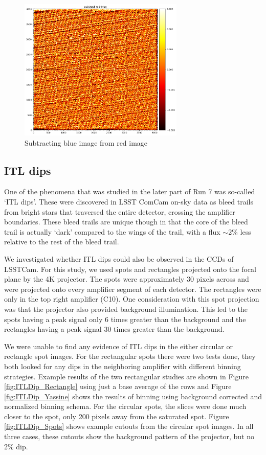 \begin{figure}[ht]
\centering
\includegraphics[width=0.7\textwidth]{figures/subtract_red_blue.png}
\caption{Subtracting blue image from red image}
\label{fig:tree_ring_subtract_red_blue}
\end{figure}

\clearpage
\subsection{ITL dips}\label{itl-dips}

One of the phenomena that was studied in the later part of Run 7 was so-called 
`ITL dips'. These were discovered in LSST ComCam on-sky data as
bleed trails from bright stars that traversed the entire detector,
crossing the amplifier boundaries. These bleed trails are unique
though in that the core of the bleed trail is actually `dark'
compared to the wings of the trail, with a flux $\sim$2\% less relative to the rest of the
bleed trail.

We investigated whether ITL dips could also be observed in the CCDs of
LSSTCam. For this study, we used spots and rectangles projected onto the focal plane by the 4K
projector. The spots were approximately 30 pixels across
and were projected onto every amplifier segment of each detector. The rectangles were only
in the top right amplifier (C10). One consideration with this spot
projection was that the projector also provided background illumination. This led to the spots having a peak signal only 6 times greater
than the background and the rectangles having a peak signal 30 times greater
than the background.

We were unable to find any evidence of ITL
dips in the either circular or rectangle spot images. For the rectangular spots there were two tests done, they both looked for any dips in the neighboring amplifier with different binning strategies. Example results of the two rectangular studies are shown in Figure \ref{fig:ITLDip_Rectangle} using just a base average of the rows and Figure \ref{fig:ITLDip_Yassine} shows the results of binning using background corrected and normalized binning schema. For the circular spots, the slices were done much closer to the spot, only 200 pixels away from the saturated spot. Figure \ref{fig:ITLDip_Spots} shows example cutouts from the circular spot images. In all three cases, these cutouts show the background
pattern of the projector, but no 2\% dip.


